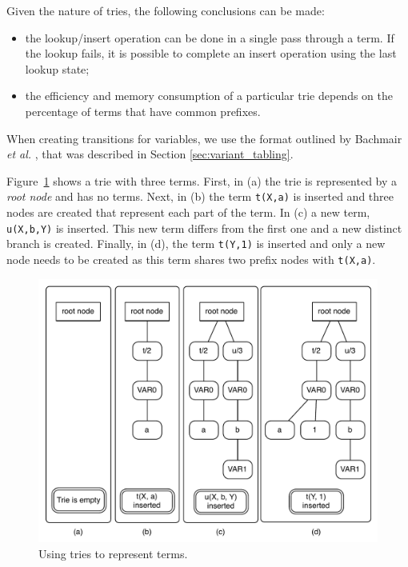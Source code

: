 Given the nature of tries, the following conclusions can be made:

\begin{itemize}
  \item the lookup/insert operation can be done in a single pass through a term. If the lookup fails, it is possible
  to complete an insert operation using the last lookup state;
  \item the efficiency and memory consumption of a
  particular trie depends on the percentage of terms that have common prefixes.
\end{itemize}

When creating transitions for variables, we use the format outlined by Bachmair \textit{et al.} \cite{Bachmair-93},
that was described in Section \ref{sec:variant_tabling}.

Figure~\ref{fig:tries_use} shows a trie with three terms. First, in (a) the trie is represented by a \textit{root node} and has
no terms. Next, in (b) the term \texttt{t(X,a)} is inserted and three nodes are created that represent each part of the term.
In (c) a new term, \texttt{u(X,b,Y)} is inserted. This new term differs from the first one and a new distinct branch is created.
Finally, in (d), the term \texttt{t(Y,1)} is inserted and only a new node needs to be created as this term shares
two prefix nodes with \texttt{t(X,a)}.

\begin{figure}[ht]
  \centering
    \includegraphics[scale=0.6]{tries.pdf}
  \caption{Using tries to represent terms.}
  \label{fig:tries_use}
\end{figure}

